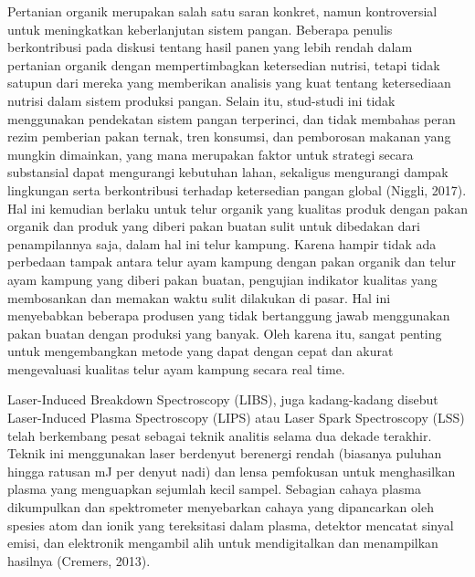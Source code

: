 \par Pertanian organik merupakan salah satu saran konkret, namun kontroversial untuk meningkatkan keberlanjutan sistem pangan. Beberapa penulis berkontribusi pada diskusi tentang hasil panen yang lebih rendah dalam pertanian organik dengan mempertimbagkan ketersedian nutrisi, tetapi tidak satupun dari mereka yang memberikan analisis yang kuat tentang ketersediaan nutrisi dalam sistem produksi pangan. Selain itu, stud-studi ini tidak menggunakan pendekatan sistem pangan terperinci, dan tidak membahas peran rezim pemberian pakan ternak, tren konsumsi, dan pemborosan makanan yang mungkin dimainkan, yang mana merupakan faktor untuk strategi secara substansial dapat mengurangi kebutuhan lahan, sekaligus mengurangi dampak lingkungan serta berkontribusi terhadap ketersedian pangan global (Niggli, 2017). Hal ini kemudian berlaku untuk telur organik yang kualitas produk dengan pakan organik dan produk yang diberi pakan buatan sulit untuk dibedakan dari penampilannya saja, dalam hal ini telur kampung. Karena hampir tidak ada perbedaan tampak antara telur ayam kampung dengan pakan organik dan telur ayam kampung yang diberi pakan buatan, pengujian indikator kualitas yang membosankan dan memakan waktu sulit dilakukan di pasar. Hal ini menyebabkan beberapa produsen yang tidak bertanggung jawab menggunakan pakan buatan dengan produksi yang banyak. Oleh karena itu, sangat penting untuk mengembangkan metode yang dapat dengan cepat dan akurat mengevaluasi kualitas telur ayam kampung secara real time.
\par Laser-Induced Breakdown Spectroscopy (LIBS), juga kadang-kadang disebut Laser-Induced Plasma Spectroscopy (LIPS) atau Laser Spark Spectroscopy (LSS) telah berkembang pesat sebagai teknik analitis selama dua dekade terakhir. Teknik ini menggunakan laser berdenyut berenergi rendah (biasanya puluhan hingga ratusan mJ per denyut nadi) dan lensa pemfokusan untuk menghasilkan plasma yang menguapkan sejumlah kecil sampel. Sebagian cahaya plasma dikumpulkan dan spektrometer menyebarkan cahaya yang dipancarkan oleh spesies atom dan ionik yang tereksitasi dalam plasma, detektor mencatat sinyal emisi, dan elektronik mengambil alih untuk mendigitalkan dan menampilkan hasilnya (Cremers, 2013).
